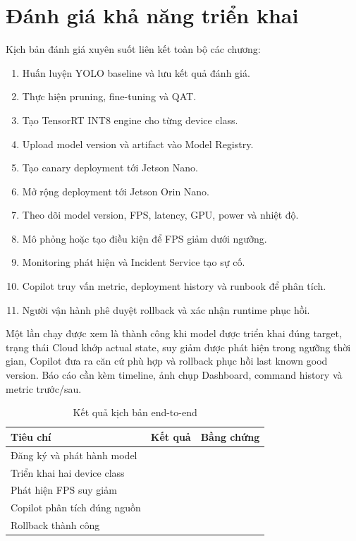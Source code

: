 \section{Đánh giá khả năng triển khai}

Kịch bản đánh giá xuyên suốt liên kết toàn bộ các chương:

\begin{enumerate}
  \item Huấn luyện YOLO baseline và lưu kết quả đánh giá.
  \item Thực hiện pruning, fine-tuning và QAT.
  \item Tạo TensorRT INT8 engine cho từng device class.
  \item Upload model version và artifact vào Model Registry.
  \item Tạo canary deployment tới Jetson Nano.
  \item Mở rộng deployment tới Jetson Orin Nano.
  \item Theo dõi model version, FPS, latency, GPU, power và nhiệt độ.
  \item Mô phỏng hoặc tạo điều kiện để FPS giảm dưới ngưỡng.
  \item Monitoring phát hiện và Incident Service tạo sự cố.
  \item Copilot truy vấn metric, deployment history và runbook để phân tích.
  \item Người vận hành phê duyệt rollback và xác nhận runtime phục hồi.
\end{enumerate}

Một lần chạy được xem là thành công khi model được triển khai đúng target, trạng
thái Cloud khớp actual state, suy giảm được phát hiện trong ngưỡng thời gian,
Copilot đưa ra căn cứ phù hợp và rollback phục hồi last known good version. Báo
cáo cần kèm timeline, ảnh chụp Dashboard, command history và metric trước/sau.

\begin{table}[H]
\centering
\caption{Kết quả kịch bản end-to-end}
\label{tab:e2e-scenario}
\begin{tabularx}{\textwidth}{L{6cm}C{3cm}Y}
\toprule
\textbf{Tiêu chí} & \textbf{Kết quả} & \textbf{Bằng chứng}\\
\midrule
Đăng ký và phát hành model &  & \\
Triển khai hai device class &  & \\
Phát hiện FPS suy giảm &  & \\
Copilot phân tích đúng nguồn &  & \\
Rollback thành công &  & \\
\bottomrule
\end{tabularx}
\end{table}